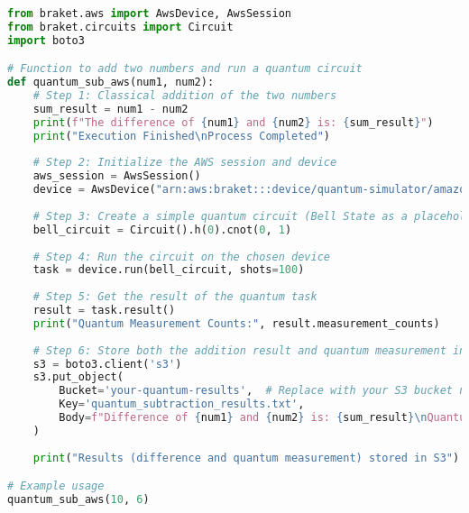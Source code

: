 \documentclass[12pt,a4paper]{article}
\begin{document}
\begin{tcolorbox}[title=aws\_quantum\_subtraction.py Script, colback=gray!5!white, colframe=blue!75!black]
\begin{lstlisting}[language=Python]
from braket.aws import AwsDevice, AwsSession
from braket.circuits import Circuit
import boto3

# Function to add two numbers and run a quantum circuit
def quantum_sub_aws(num1, num2):
    # Step 1: Classical addition of the two numbers
    sum_result = num1 - num2
    print(f"The difference of {num1} and {num2} is: {sum_result}")
    print("Execution Finished\nProcess Completed")
    
    # Step 2: Initialize the AWS session and device
    aws_session = AwsSession()
    device = AwsDevice("arn:aws:braket:::device/quantum-simulator/amazon/sv1")
    
    # Step 3: Create a simple quantum circuit (Bell State as a placeholder)
    bell_circuit = Circuit().h(0).cnot(0, 1)
    
    # Step 4: Run the circuit on the chosen device
    task = device.run(bell_circuit, shots=100)
    
    # Step 5: Get the result of the quantum task
    result = task.result()
    print("Quantum Measurement Counts:", result.measurement_counts)
    
    # Step 6: Store both the addition result and quantum measurement in S3
    s3 = boto3.client('s3')
    s3.put_object(
        Bucket='your-quantum-results',  # Replace with your S3 bucket name
        Key='quantum_subtraction_results.txt',
        Body=f"Difference of {num1} and {num2} is: {sum_result}\nQuantum Measurement: {result.measurement_counts}\nExecution Finished\nProcess Completed"
    )
    
    print("Results (difference and quantum measurement) stored in S3")

# Example usage
quantum_sub_aws(10, 6)
\end{lstlisting}
\end{tcolorbox}
\end{document}
